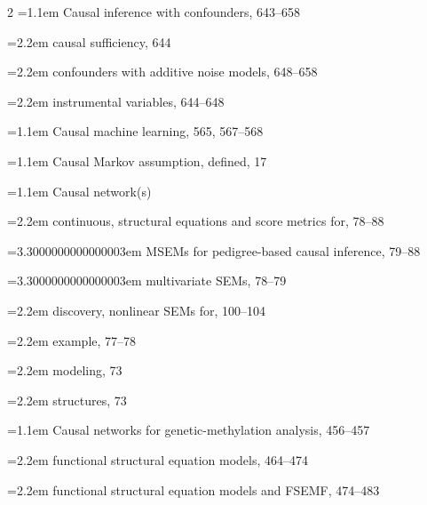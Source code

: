 \begin{multicols}{2}
\noindent\hangindent=1.1em Causal inference with confounders, 643--658\par
\noindent\hangindent=2.2em \hspace*{1.1em}causal sufficiency, 644\par
\noindent\hangindent=2.2em \hspace*{1.1em}confounders with additive noise models, 648--658\par
\noindent\hangindent=2.2em \hspace*{1.1em}instrumental variables, 644--648\par
\noindent\hangindent=1.1em Causal machine learning, 565, 567--568\par
\noindent\hangindent=1.1em Causal Markov assumption, defined, 17\par
\noindent\hangindent=1.1em Causal network(s)\par
\noindent\hangindent=2.2em \hspace*{1.1em}continuous, structural equations and score metrics for, 78--88\par
\noindent\hangindent=3.3000000000000003em \hspace*{2.2em}MSEMs for pedigree-based causal inference, 79--88\par
\noindent\hangindent=3.3000000000000003em \hspace*{2.2em}multivariate SEMs, 78--79\par
\noindent\hangindent=2.2em \hspace*{1.1em}discovery, nonlinear SEMs for, 100--104\par
\noindent\hangindent=2.2em \hspace*{1.1em}example, 77--78\par
\noindent\hangindent=2.2em \hspace*{1.1em}modeling, 73\par
\noindent\hangindent=2.2em \hspace*{1.1em}structures, 73\par
\noindent\hangindent=1.1em Causal networks for genetic-methylation analysis, 456--457\par
\noindent\hangindent=2.2em \hspace*{1.1em}functional structural equation models, 464--474\par
\noindent\hangindent=2.2em \hspace*{1.1em}functional structural equation models and FSEMF, 474--483\par

\end{multicols}
